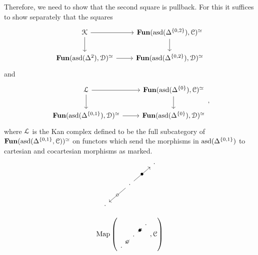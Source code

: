 \documentclass[main.tex]{subfiles}
\begin{document}
Therefore, we need to show that the second square is pullback. For this it suffices to show separately that the squares
\begin{equation*}
  \begin{tikzcd}
    \category{K}
    \arrow[r]
    \arrow[d]
    & \Fun(\asd(\Delta^{\{0, 2\}}), \category{C})^{\simeq}
    \arrow[d]
    \\
    \Fun(\asd(\Delta^{2}), \category{D})^{\simeq}
    \arrow[r]
    & \Fun(\asd(\Delta^{\{0, 2\}}), \category{D})^{\simeq}
  \end{tikzcd}
\end{equation*}
and
\begin{equation*}
  \begin{tikzcd}
    \category{L}
    \arrow[r]
    \arrow[d]
    & \Fun(\asd(\Delta^{\{0\}}), \category{C})^{\simeq}
    \arrow[d]
    \\
    \Fun(\asd(\Delta^{\{0, 1\}}), \category{D})^{\simeq}
    \arrow[r]
    & \Fun(\asd(\Delta^{\{0\}}), \category{D})^{\simeq}
  \end{tikzcd},
\end{equation*}
where $\mathcal{L}$ is the Kan complex defined to be the full subcategory of $\mathbf{Fun}(\mathrm{asd}(\Delta^{\{0, 1\}}, \mathcal{C}))^{\simeq}$ on functors which send the morphisms in $\mathrm{asd}(\Delta^{\{0, 1\}})$ to cartesian and cocartesian morphisms as marked.
\begin{equation*}
  \begin{tikzcd}
    && \cdot
    \\
    & \cdot
    \arrow[ur, "\bullet" marking]
    \arrow[dl, "\circ" marking]
    \\
    \cdot
  \end{tikzcd}
\end{equation*}


\begin{equation*}
  \Map\left(
  \begin{tikzcd}[row sep=tiny, column sep=tiny]
    && \cdot
    \\
    & \cdot
    \arrow[ur, "\bullet" marking]
    \arrow[dl, "\circ" marking]
    \\
    \cdot
  \end{tikzcd},
  \category{C}
  \right)
\end{equation*}
\end{document}
